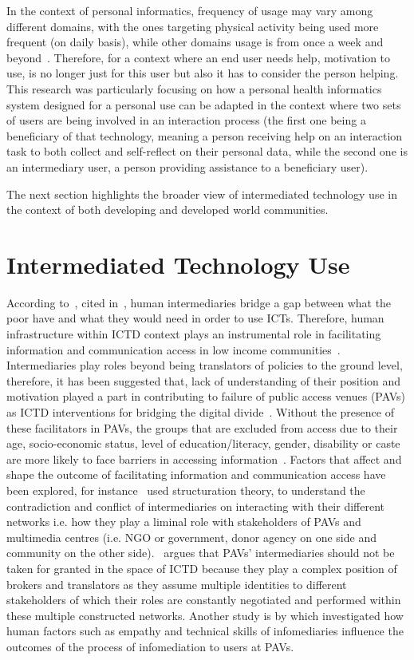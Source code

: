 In the context of personal informatics, frequency of usage may vary among different domains, with the ones targeting physical activity being used more frequent (on daily basis), while other domains usage is from once a week and beyond~\citep{epstein2015lived}. Therefore, for a context where an end user needs help, motivation to use, is no longer just for this user but also it has to consider the person helping. This research was particularly focusing on how a personal health informatics system  designed for a personal use can be adapted in the context where two sets of users are being involved in an interaction process (the first one being a beneficiary of that technology, meaning a person receiving help on an interaction task to both collect and self-reflect on their personal data, while the second one is an intermediary user, a person providing assistance to a beneficiary user).

The next section highlights the broader view of intermediated technology use in the context of both developing and developed world communities.  

\section{Intermediated Technology Use}
According to~\cite{heeks1999tyranny}, cited in~\cite{bailur2012complex}, human intermediaries bridge a gap between what the poor have and what they would need in order to use ICTs. Therefore, human infrastructure within ICTD context plays an instrumental role in facilitating information and communication access in low income communities~\citep{sambasivan2010human}. Intermediaries play roles beyond being translators of policies to the ground level, therefore, it has been suggested that, lack of understanding of their position and motivation played a part in contributing to failure of public access venues (PAVs) as ICTD interventions for bridging the digital divide~\citep{bailur2010liminal}. Without the presence of these facilitators in PAVs, the groups that are excluded from access due to their age, socio-economic status, level of education/literacy, gender, disability or caste are more likely to face barriers in accessing information~\citep{ramirez2013infomediaries}. Factors that affect and shape the outcome of facilitating information and communication access have been explored, for instance~\cite{bailur2010liminal} used structuration theory\citep{jones2008giddens}, to understand the contradiction and conflict of intermediaries on interacting with their different networks i.e. how they play a liminal role with stakeholders of PAVs and multimedia centres (i.e. NGO or government, donor agency on one side and community on the other side).~\cite{bailur2012complex} argues that PAVs' intermediaries should not be taken for granted in the space of ICTD because they play a complex position of brokers and translators as they assume multiple identities to different stakeholders of which their roles are constantly negotiated and performed within these multiple constructed networks. Another study is by \cite{ramirez2013infomediaries} which investigated how human factors such as empathy and technical skills of infomediaries influence the outcomes of the process of infomediation to users at PAVs. 


